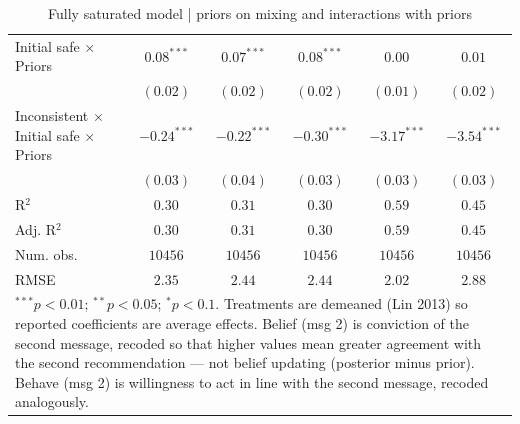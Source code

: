 \begin{table}
\begin{center}
\begin{tabular}{l c c c c c}
Initial safe $\times$ Priors                        & $0.08^{***}$  & $0.07^{***}$  & $0.08^{***}$  & $0.00$        & $0.01$        \\
                                                    & $(0.02)$      & $(0.02)$      & $(0.02)$      & $(0.01)$      & $(0.02)$      \\
Inconsistent $\times$ Initial safe $\times$ Priors  & $-0.24^{***}$ & $-0.22^{***}$ & $-0.30^{***}$ & $-3.17^{***}$ & $-3.54^{***}$ \\
                                                    & $(0.03)$      & $(0.04)$      & $(0.03)$      & $(0.03)$      & $(0.03)$      \\
\hline
R$^2$                                               & $0.30$        & $0.31$        & $0.30$        & $0.59$        & $0.45$        \\
Adj. R$^2$                                          & $0.30$        & $0.31$        & $0.30$        & $0.59$        & $0.45$        \\
Num. obs.                                           & $10456$       & $10456$       & $10456$       & $10456$       & $10456$       \\
RMSE                                                & $2.35$        & $2.44$        & $2.44$        & $2.02$        & $2.88$        \\
\hline
\multicolumn{6}{l}{\scriptsize{\item $^{***}p<0.01$; $^{**}p<0.05$; $^{*}p<0.1$. Treatments are demeaned (Lin 2013) so reported coefficients are average effects. Belief (msg 2) is conviction of the second message, recoded so that higher values mean greater agreement with the second recommendation --- not belief updating (posterior minus prior). Behave (msg 2) is willingness to act in line with the second message, recoded analogously.}}
\end{tabular}
\caption{Fully saturated model | priors on mixing and interactions with priors}
\label{table:saturated_priors_interactions}
\end{center}
\end{table}

